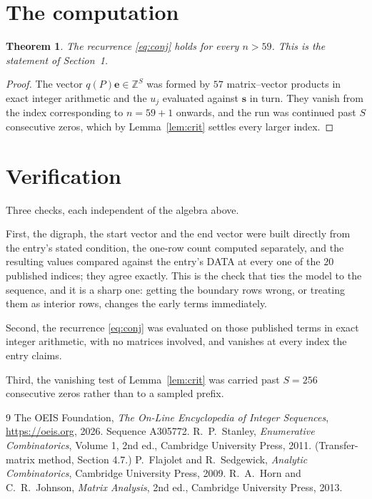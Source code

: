 \documentclass[11pt,a4paper]{article}
\theoremstyle{plain}
\newtheorem{theorem}{Theorem}
\theoremstyle{definition}
\begin{document}
\section{The computation}

\begin{theorem}
The recurrence \eqref{eq:conj} holds for every $n>59$. This is the statement of
Section~1.
\end{theorem}

\begin{proof}
The vector $q(P)\mathbf{e}\in\mathbb{Z}^{S}$ was formed by $57$ matrix--vector
products in exact integer arithmetic and the $u_j$ evaluated against $\mathbf{s}$ in turn.
They vanish from the index corresponding to $n=59+1$ onwards, and the run was continued
past $S$ consecutive zeros, which by Lemma~\ref{lem:crit} settles every larger index.
\end{proof}

\section{Verification}

Three checks, each independent of the algebra above.

First, the digraph, the start vector and the end vector were built directly from the
entry's stated condition, the one-row count computed separately, and the resulting values
compared against the entry's DATA at every one of the $20$ published indices; they
agree exactly. This is the check that ties the model to the sequence, and it is a sharp one:
getting the boundary rows wrong, or treating them as interior rows, changes the early terms
immediately.

Second, the recurrence \eqref{eq:conj} was evaluated on those published terms in exact
integer arithmetic, with no matrices involved, and vanishes at every index the entry claims.

Third, the vanishing test of Lemma~\ref{lem:crit} was carried past $S=256$ consecutive
zeros rather than to a sampled prefix.

\begin{thebibliography}{9}
 The OEIS Foundation, \emph{The On-Line Encyclopedia of Integer
Sequences}, \url{https://oeis.org}, 2026. Sequence A305772.
 R.~P.~Stanley, \emph{Enumerative Combinatorics}, Volume 1, 2nd ed.,
Cambridge University Press, 2011. (Transfer-matrix method, Section 4.7.)
 P.~Flajolet and R.~Sedgewick, \emph{Analytic Combinatorics}, Cambridge
University Press, 2009.
 R.~A.~Horn and C.~R.~Johnson, \emph{Matrix Analysis}, 2nd ed., Cambridge
University Press, 2013.
\end{thebibliography}
\end{document}
